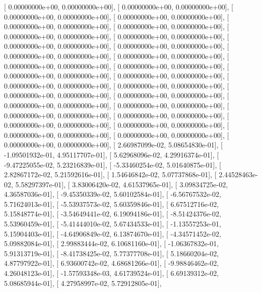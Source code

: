 \documentclass{article}
\begin{document}
       [  0.00000000e+00,   0.00000000e+00],
       [  0.00000000e+00,   0.00000000e+00],
       [  0.00000000e+00,   0.00000000e+00],
       [  0.00000000e+00,   0.00000000e+00],
       [  0.00000000e+00,   0.00000000e+00],
       [  0.00000000e+00,   0.00000000e+00],
       [  0.00000000e+00,   0.00000000e+00],
       [  0.00000000e+00,   0.00000000e+00],
       [  0.00000000e+00,   0.00000000e+00],
       [  0.00000000e+00,   0.00000000e+00],
       [  0.00000000e+00,   0.00000000e+00],
       [  0.00000000e+00,   0.00000000e+00],
       [  0.00000000e+00,   0.00000000e+00],
       [  0.00000000e+00,   0.00000000e+00],
       [  0.00000000e+00,   0.00000000e+00],
       [  0.00000000e+00,   0.00000000e+00],
       [  0.00000000e+00,   0.00000000e+00],
       [  0.00000000e+00,   0.00000000e+00],
       [  0.00000000e+00,   0.00000000e+00],
       [  0.00000000e+00,   0.00000000e+00],
       [  0.00000000e+00,   0.00000000e+00],
       [  0.00000000e+00,   0.00000000e+00],
       [  0.00000000e+00,   0.00000000e+00],
       [  0.00000000e+00,   0.00000000e+00],
       [  0.00000000e+00,   0.00000000e+00],
       [  0.00000000e+00,   0.00000000e+00],
       [  0.00000000e+00,   0.00000000e+00],
       [  0.00000000e+00,   0.00000000e+00],
       [  0.00000000e+00,   0.00000000e+00],
       [  2.66987099e-02,   5.08654830e-01],
       [ -1.09501932e-01,   4.95117707e-01],
       [  5.62968096e-02,   4.29916374e-01],
       [ -9.47225055e-02,   5.23216839e-01],
       [ -5.33460254e-02,   5.01640875e-01],
       [  2.82867172e-02,   5.21592616e-01],
       [  1.54646842e-02,   5.07737868e-01],
       [  2.44528463e-02,   5.58297397e-01],
       [  3.83006420e-02,   4.61537965e-01],
       [  3.09834725e-02,   4.36587036e-01],
       [ -9.45350339e-02,   5.60102584e-01],
       [ -6.56767532e-02,   5.71624013e-01],
       [ -5.53937573e-02,   5.60359846e-01],
       [  6.67512716e-02,   5.15848774e-01],
       [ -3.54649441e-02,   6.19094186e-01],
       [ -8.51424376e-02,   5.53960459e-01],
       [ -5.41444010e-02,   5.67434533e-01],
       [ -1.13557253e-01,   5.15904403e-01],
       [ -4.64906849e-02,   6.13874670e-01],
       [ -4.34571452e-02,   5.09882084e-01],
       [  2.99883444e-02,   6.10681160e-01],
       [ -1.06367832e-01,   5.91313719e-01],
       [ -8.41738425e-02,   5.77377708e-01],
       [  5.18660204e-02,   4.87797922e-01],
       [  6.93600742e-02,   4.68681266e-01],
       [ -9.98846462e-02,   4.26048123e-01],
       [ -1.57593348e-03,   4.61739524e-01],
       [  6.69139312e-02,   5.08685944e-01],
       [  4.27958997e-02,   5.72912805e-01],
\end{document}
